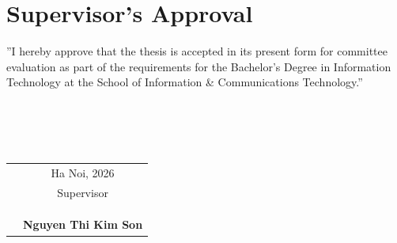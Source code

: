 \chapter*{Supervisor’s Approval}


”I hereby approve that the thesis is accepted in its present form for committee evaluation as part of the requirements for the Bachelor’s Degree in Information Technology at the School of Information \& Communications Technology.”
\\
\\
\\
\\
\\
\begin{table}[!ht]
\begin{tabular}{p{}c}
 & Ha Noi, 2026 \\
 & Supervisor \\
 &              \\
 &              \\
 &              \\
 & \textbf{Nguyen Thi Kim Son} 
\end{tabular}
\end{table}